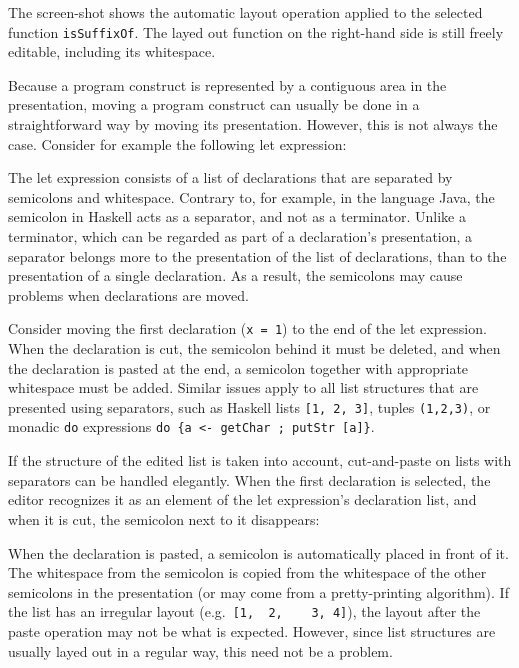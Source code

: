 The screen-shot shows the automatic layout operation applied to the selected function {\tt isSuffixOf}. The layed out function on the right-hand side is still freely editable, including its whitespace.


Because a program construct is represented by a contiguous area in the presentation, moving a program construct can usually be done in a straightforward way by moving its presentation. However, this is not always the case. Consider for example the following let expression:


The let expression consists of a list of declarations that are separated by semicolons and whitespace. Contrary to, for example, in the language Java, the semicolon in Haskell acts as a separator, and not as a terminator. Unlike a terminator, which can be regarded as part of a declaration's presentation, a separator belongs more to the presentation of the list of declarations, than to the presentation of a single declaration. As a result, the semicolons may cause problems when declarations are moved.

Consider moving the first declaration (\verb|x = 1|) to the end of the let expression. When the declaration is cut, the semicolon behind it must be deleted, and when the declaration is pasted at the end, a semicolon together with appropriate whitespace must be added. Similar issues apply to all list structures that are presented using separators, such as Haskell lists \verb|[1, 2, 3]|, tuples \verb|(1,2,3)|, or monadic \verb|do| expressions \verb|do {a <- getChar ; putStr [a]}|.

If the structure of the edited list is taken into account, cut-and-paste on lists with separators can be handled elegantly. When the first declaration is selected, the editor recognizes it as an element of the let expression's declaration list, and when it is cut, the semicolon next to it disappears:


When the declaration is pasted, a semicolon is automatically placed in front of it. The whitespace from the semicolon is copied from the whitespace of the other semicolons in the presentation (or may come from a pretty-printing algorithm). If the list has an irregular layout (e.g.\ \verb|[1,  2,    3, 4]|), the layout after the paste operation may not be what is expected. However, since list structures are usually layed out in a regular way, this need not be a problem.

